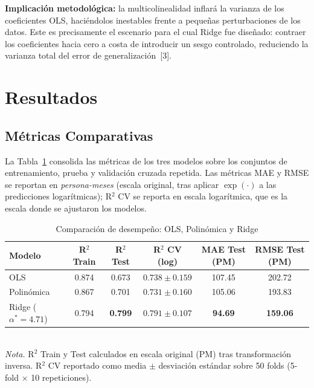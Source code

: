 \documentclass[11pt,a4paper]{article}
\begin{document}
\noindent\textbf{Implicación metodológica:} la multicolinealidad inflará la varianza de los coeficientes OLS, haciéndolos inestables frente a pequeñas perturbaciones de los datos. Este es precisamente el escenario para el cual Ridge fue diseñado: contraer los coeficientes hacia cero a costa de introducir un sesgo controlado, reduciendo la varianza total del error de generalización~[3].

\section{Resultados}

\subsection{Métricas Comparativas}

La Tabla~\ref{tab:metricas} consolida las métricas de los tres modelos sobre los conjuntos de entrenamiento, prueba y validación cruzada repetida. Las métricas MAE y RMSE se reportan en \emph{persona-meses} (escala original, tras aplicar $\exp(\cdot)$ a las predicciones logarítmicas); R$^2$ CV se reporta en escala logarítmica, que es la escala donde se ajustaron los modelos.

\begin{table}[!ht]
\caption{Comparación de desempeño: OLS, Polinómica y Ridge}\label{tab:metricas}
\centering
\renewcommand{\arraystretch}{1.3}
\small
\begin{tabular}{|l|c|c|c|c|c|}
\hline
\rowcolor{headerblue}
\color{white}\textbf{Modelo} &
\color{white}\textbf{R$^2$ Train} &
\color{white}\textbf{R$^2$ Test} &
\color{white}\textbf{R$^2$ CV (log)} &
\color{white}\textbf{MAE Test (PM)} &
\color{white}\textbf{RMSE Test (PM)} \\
\hline
OLS         & 0.874 & 0.673 & $0.738 \pm 0.159$ & 107.45 & 202.72 \\
\hline
\rowcolor{rowgray}
Polinómica  & 0.867 & 0.701 & $0.731 \pm 0.160$ & 105.06 & 193.83 \\
\hline
Ridge ($\alpha^{*}=4.71$) & 0.794 & \textbf{0.799} & $\mathbf{0.791 \pm 0.107}$ & \textbf{94.69} & \textbf{159.06} \\
\hline
\end{tabular}
\\[2pt]
\small\textit{Nota.} R$^2$ Train y Test calculados en escala original (PM) tras transformación inversa. R$^2$ CV reportado como media $\pm$ desviación estándar sobre 50 folds (5-fold $\times$ 10 repeticiones).
\end{table}
\end{document}

